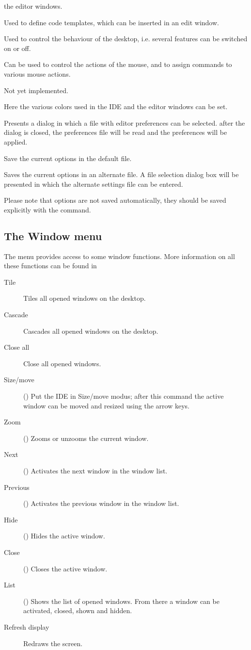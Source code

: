 \begin{description}
\begin{description}
the editor windows.
\item[Codetemplates]
Used to define code templates, which can be inserted in an edit window.
\item[Desktop]
Used to control the behaviour of the desktop, i.e. several features can be
switched on or off.
\item[Mouse]
Can be used to control the actions of the mouse, and to assign commands to
various mouse actions.
\item[Startup]
Not yet implemented.
\item[Colors]
Here the various colors used in the IDE and the editor windows can be set.
\end{description}
\item[Open]
Presents a dialog in which a file with editor preferences can be selected.
after the dialog is closed, the preferences file will be read and the
preferences will be applied.
\item[Save]
Save the current options in the default file.
\item[Save as]
Saves the current options in an alternate file. A file selection dialog box
will be presented in which the alternate settings file can be entered.
\end{description}
Please note that options are not saved automatically, they should be saved
explicitly with the  command.
%
%
\subsection{The Window menu}
\label{se:menuwindow}
The  menu provides access to some window functions. More information
on all these functions can be found in 
\begin{description}
\item[Tile]
Tiles all opened windows on the desktop.
\item[Cascade]
Cascades all opened windows on the desktop.
\item[Close all]
Close all opened windows.
\item[Size/move] ()
Put the IDE in Size/move modus; after this command the active window can be
moved and resized using the arrow keys.
\item[Zoom] ()
Zooms or unzooms the current window.
\item[Next] ()
Activates the next window in the window list.
\item[Previous] ()
Activates the previous window in the window list.
\item[Hide] ()
Hides the active window.
\item[Close] ()
Closes the active window.
\item[List] ()
Shows the list of opened windows. From there a
window can be activated, closed, shown and hidden.
\item[Refresh display]
Redraws the screen.
\end{description}
%
%
